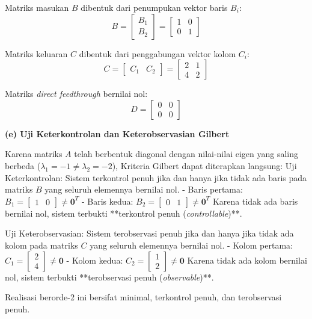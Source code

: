 \documentclass[11pt,a4paper]{article}
\begin{document}
Matriks masukan $B$ dibentuk dari penumpukan vektor baris $B_i$:
$$B = \begin{bmatrix} B_1 \\ B_2 \end{bmatrix} = \begin{bmatrix} 1 & 0 \\ 0 & 1 \end{bmatrix}$$

Matriks keluaran $C$ dibentuk dari penggabungan vektor kolom $C_i$:
$$C = \begin{bmatrix} C_1 & C_2 \end{bmatrix} = \begin{bmatrix} 2 & 1 \\ 4 & 2 \end{bmatrix}$$

Matriks \textit{direct feedthrough} bernilai nol:
$$D = \begin{bmatrix} 0 & 0 \\ 0 & 0 \end{bmatrix}$$

\textbf{(e) Uji Keterkontrolan dan Keterobservasian Gilbert}

Karena matriks $A$ telah berbentuk diagonal dengan nilai-nilai eigen yang saling berbeda ($\lambda_1 = -1 \ne \lambda_2 = -2$), Kriteria Gilbert dapat diterapkan langsung:
Uji Keterkontrolan: Sistem terkontrol penuh jika dan hanya jika tidak ada baris pada matriks $B$ yang seluruh elemennya bernilai nol.
- Baris pertama: $B_1 = \begin{bmatrix} 1 & 0 \end{bmatrix} \ne \mathbf{0}^T$
- Baris kedua: $B_2 = \begin{bmatrix} 0 & 1 \end{bmatrix} \ne \mathbf{0}^T$
Karena tidak ada baris bernilai nol, sistem terbukti **terkontrol penuh (\textit{controllable})**.

Uji Keterobservasian: Sistem terobservasi penuh jika dan hanya jika tidak ada kolom pada matriks $C$ yang seluruh elemennya bernilai nol.
- Kolom pertama: $C_1 = \begin{bmatrix} 2 \\ 4 \end{bmatrix} \ne \mathbf{0}$
- Kolom kedua: $C_2 = \begin{bmatrix} 1 \\ 2 \end{bmatrix} \ne \mathbf{0}$
Karena tidak ada kolom bernilai nol, sistem terbukti **terobservasi penuh (\textit{observable})**.

Realisasi berorde-2 ini bersifat minimal, terkontrol penuh, dan terobservasi penuh.
\end{document}
